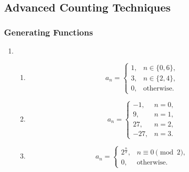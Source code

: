 \documentclass{sig-alternate-05-2015}
\begin{document}
\subsection{Advanced Counting Techniques}
\subsubsection{Generating Functions}
\begin{enumerate}
	\item \begin{enumerate}
		\item \begin{equation}
			a_n = \begin{cases}
				1,&n \in \{0, 6\},\\
				3,&n \in \{2, 4\},\\
				0,&\text{otherwise.}
			\end{cases}
		\end{equation}
		
		\item \begin{equation}
			a_n = \begin{cases}
				-1,&n = 0,\\
				9,&n = 1,\\
				27,&n = 2,\\
				-27,&n = 3.
			\end{cases}
		\end{equation}
		
		\item \begin{equation}
			a_n = \begin{cases}
				2^{\frac{n}{2}}, & n \equiv 0 \pmod{2},\\
				0, & \text{otherwise}.
			\end{cases}
		\end{equation}
		

\end{enumerate}
\end{enumerate}
\end{document}
